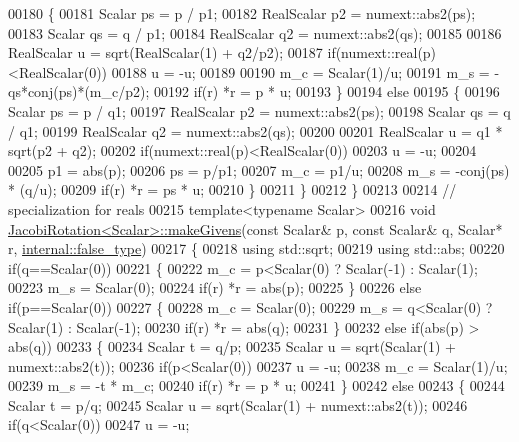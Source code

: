 \begin{DoxyCode}
00180     \{
00181       Scalar ps = p / p1;
00182       RealScalar p2 = numext::abs2(ps);
00183       Scalar qs = q / p1;
00184       RealScalar q2 = numext::abs2(qs);
00185 
00186       RealScalar u = sqrt(RealScalar(1) + q2/p2);
00187       \textcolor{keywordflow}{if}(numext::real(p)<RealScalar(0))
00188         u = -u;
00189 
00190       m\_c = Scalar(1)/u;
00191       m\_s = -qs*conj(ps)*(m\_c/p2);
00192       \textcolor{keywordflow}{if}(r) *r = p * u;
00193     \}
00194     \textcolor{keywordflow}{else}
00195     \{
00196       Scalar ps = p / q1;
00197       RealScalar p2 = numext::abs2(ps);
00198       Scalar qs = q / q1;
00199       RealScalar q2 = numext::abs2(qs);
00200 
00201       RealScalar u = q1 * sqrt(p2 + q2);
00202       \textcolor{keywordflow}{if}(numext::real(p)<RealScalar(0))
00203         u = -u;
00204 
00205       p1 = abs(p);
00206       ps = p/p1;
00207       m\_c = p1/u;
00208       m\_s = -conj(ps) * (q/u);
00209       \textcolor{keywordflow}{if}(r) *r = ps * u;
00210     \}
00211   \}
00212 \}
00213 
00214 \textcolor{comment}{// specialization for reals}
00215 \textcolor{keyword}{template}<\textcolor{keyword}{typename} Scalar>
00216 \textcolor{keywordtype}{void} \hyperlink{group___jacobi___module_af73c81e9cc139b7e0d877ce553b02ec0}{JacobiRotation<Scalar>::makeGivens}(\textcolor{keyword}{const} Scalar& p, \textcolor{keyword}{const} Scalar& q,
       Scalar* r, \hyperlink{struct_eigen_1_1internal_1_1false__type}{internal::false\_type})
00217 \{
00218   \textcolor{keyword}{using} std::sqrt;
00219   \textcolor{keyword}{using} std::abs;
00220   \textcolor{keywordflow}{if}(q==Scalar(0))
00221   \{
00222     m\_c = p<Scalar(0) ? Scalar(-1) : Scalar(1);
00223     m\_s = Scalar(0);
00224     \textcolor{keywordflow}{if}(r) *r = abs(p);
00225   \}
00226   \textcolor{keywordflow}{else} \textcolor{keywordflow}{if}(p==Scalar(0))
00227   \{
00228     m\_c = Scalar(0);
00229     m\_s = q<Scalar(0) ? Scalar(1) : Scalar(-1);
00230     \textcolor{keywordflow}{if}(r) *r = abs(q);
00231   \}
00232   \textcolor{keywordflow}{else} \textcolor{keywordflow}{if}(abs(p) > abs(q))
00233   \{
00234     Scalar t = q/p;
00235     Scalar u = sqrt(Scalar(1) + numext::abs2(t));
00236     \textcolor{keywordflow}{if}(p<Scalar(0))
00237       u = -u;
00238     m\_c = Scalar(1)/u;
00239     m\_s = -t * m\_c;
00240     \textcolor{keywordflow}{if}(r) *r = p * u;
00241   \}
00242   \textcolor{keywordflow}{else}
00243   \{
00244     Scalar t = p/q;
00245     Scalar u = sqrt(Scalar(1) + numext::abs2(t));
00246     \textcolor{keywordflow}{if}(q<Scalar(0))
00247       u = -u;

\end{DoxyCode}
